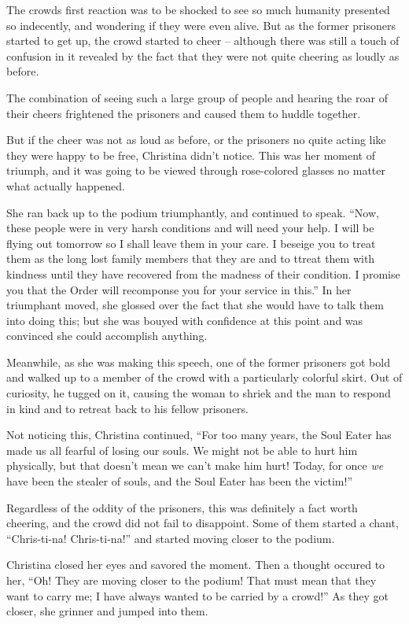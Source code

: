 \documentclass[showtrims,b6paper,draft,10pt]{memoir}
\begin{document}
The crowds first reaction was to be shocked to see so much humanity presented so indecently, and wondering if they were even alive.  But as the former prisoners started to get up, the crowd started to cheer -- although there was still a touch of confusion in it revealed by the fact that they were not quite cheering as loudly as before.

The combination of seeing such a large group of people and hearing the roar of their cheers frightened the prisoners and caused them to huddle together.

But if the cheer was not as loud as before, or the prisoners no quite acting like they were happy to be free, Christina didn't notice.  This was her moment of triumph, and it was going to be viewed through rose-colored glasses no matter what actually happened.

She ran back up to the podium triumphantly, and continued to speak.  ``Now, these people were in very harsh conditions and will need your help.  I will be flying out tomorrow so I shall leave them in your care.  I beseige you to treat them as the long lost family members that they are and to ttreat them with kindness until they have recovered from the madness of their condition.  I promise you that the Order will recomponse you for your service in this.''  In her triumphant moved, she glossed over the fact that she would have to talk them into doing this;  but she was bouyed with confidence at this point and was convinced she could accomplish anything.

Meanwhile, as she was making this speech, one of the former prisoners got bold and walked up to a member of the crowd with a particularly colorful skirt.  Out of curiosity, he tugged on it, causing the woman to shriek and the man to respond in kind and to retreat back to his fellow prisoners.

Not noticing this, Christina continued, ``For too many years, the Soul Eater has made us all fearful of losing our souls.  We might not be able to hurt him physically, but that doesn't mean we can't make him hurt!  Today, for once \emph{we} have been the stealer of souls, and the Soul Eater has been the victim!''

Regardless of the oddity of the prisoners, this was definitely a fact worth cheering, and the crowd did not fail to disappoint.  Some of them started a chant, ``Chris-ti-na!  Chris-ti-na!'' and started moving closer to the podium.

Christina closed her eyes and savored the moment.  Then a thought occured to her, ``Oh!  They are moving closer to the podium!  That must mean that they want to carry me;  I have always wanted to be carried by a crowd!''  As they got closer, she grinner and jumped into them.
\end{document}
